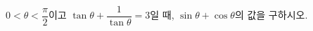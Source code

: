 $0<\theta<\dfrac{\pi}{2}$이고 $\tan\theta+\dfrac{1}{\tan\theta}=3$일 때, $\sin\theta+\cos\theta$의 값을 구하시오.

